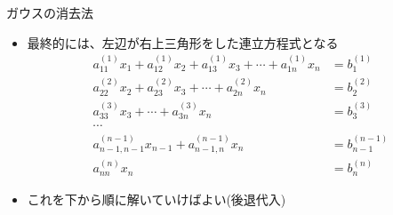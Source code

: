 \begin{frame}[t,fragile]{ガウスの消去法}
  \begin{itemize}
  \item 最終的には、左辺が右上三角形をした連立方程式となる
    \begin{align*}
    a_{11}^{(1)} x_1 + a_{12}^{(1)} x_2 + a_{13}^{(1)} x_3 + \cdots + a_{1n}^{(1)} x_n &= b_{1}^{(1)} \\
    a_{22}^{(2)} x_2 + a_{23}^{(2)} x_3 + \cdots + a_{2n}^{(2)} x_n &= b_{2}^{(2)} \\
    a_{33}^{(3)} x_3 + \cdots + a_{3n}^{(3)} x_n &= b_{3}^{(3)} \\
    \cdots \\
    a_{n-1,n-1}^{(n-1)} x_{n-1} + a_{n-1,n}^{(n-1)} x_n &= b_{n-1}^{(n-1)} \\
    a_{nn}^{(n)} x_n &= b_{n}^{(n)}
    \end{align*}
  \item これを下から順に解いていけばよい(後退代入)
  \end{itemize}
\end{frame}
